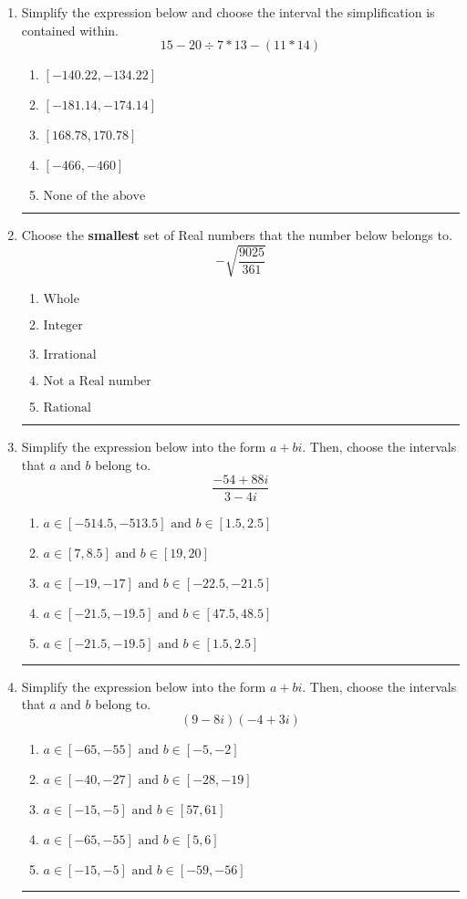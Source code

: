 \documentclass[14pt]{extbook}
\newcommand{\litem}[1]{\item#1\hspace*{-1cm}\rule{\textwidth}{0.4pt}}
\begin{document}
\begin{enumerate}
{\begin{enumerate}[label=\Alph*.]
\end{enumerate} }
\litem{
Simplify the expression below and choose the interval the simplification is contained within.\[ 15 - 20 \div 7 * 13 - (11 * 14) \]\begin{enumerate}[label=\Alph*.]
\item \( [-140.22, -134.22] \)
\item \( [-181.14, -174.14] \)
\item \( [168.78, 170.78] \)
\item \( [-466, -460] \)
\item \( \text{None of the above} \)

\end{enumerate} }
\litem{
Choose the \textbf{smallest} set of Real numbers that the number below belongs to.\[ -\sqrt{\frac{9025}{361}} \]\begin{enumerate}[label=\Alph*.]
\item \( \text{Whole} \)
\item \( \text{Integer} \)
\item \( \text{Irrational} \)
\item \( \text{Not a Real number} \)
\item \( \text{Rational} \)

\end{enumerate} }
\litem{
Simplify the expression below into the form $a+bi$. Then, choose the intervals that $a$ and $b$ belong to.\[ \frac{-54 + 88 i}{3 - 4 i} \]\begin{enumerate}[label=\Alph*.]
\item \( a \in [-514.5, -513.5] \text{ and } b \in [1.5, 2.5] \)
\item \( a \in [7, 8.5] \text{ and } b \in [19, 20] \)
\item \( a \in [-19, -17] \text{ and } b \in [-22.5, -21.5] \)
\item \( a \in [-21.5, -19.5] \text{ and } b \in [47.5, 48.5] \)
\item \( a \in [-21.5, -19.5] \text{ and } b \in [1.5, 2.5] \)

\end{enumerate} }
\litem{
Simplify the expression below into the form $a+bi$. Then, choose the intervals that $a$ and $b$ belong to.\[ (9 - 8 i)(-4 + 3 i) \]\begin{enumerate}[label=\Alph*.]
\item \( a \in [-65, -55] \text{ and } b \in [-5, -2] \)
\item \( a \in [-40, -27] \text{ and } b \in [-28, -19] \)
\item \( a \in [-15, -5] \text{ and } b \in [57, 61] \)
\item \( a \in [-65, -55] \text{ and } b \in [5, 6] \)
\item \( a \in [-15, -5] \text{ and } b \in [-59, -56] \)


\end{enumerate}}
\end{enumerate}
\end{document}
